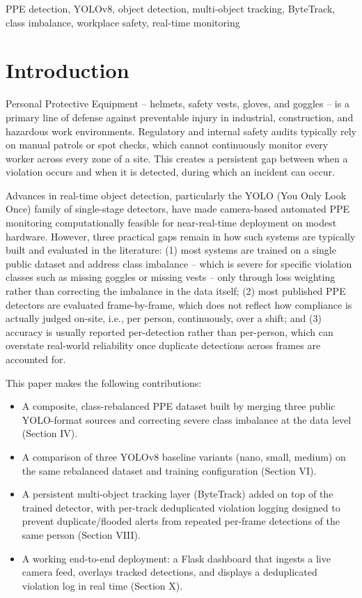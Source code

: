 \documentclass[conference]{IEEEtran}
\begin{document}
\begin{IEEEkeywords}
PPE detection, YOLOv8, object detection, multi-object tracking, ByteTrack, class imbalance, workplace safety, real-time monitoring
\end{IEEEkeywords}

\section{Introduction}

Personal Protective Equipment -- helmets, safety vests, gloves, and goggles -- is a primary line of defense against preventable injury in industrial, construction, and hazardous work environments. Regulatory and internal safety audits typically rely on manual patrols or spot checks, which cannot continuously monitor every worker across every zone of a site. This creates a persistent gap between when a violation occurs and when it is detected, during which an incident can occur.

Advances in real-time object detection, particularly the YOLO (You Only Look Once) family of single-stage detectors, have made camera-based automated PPE monitoring computationally feasible for near-real-time deployment on modest hardware. However, three practical gaps remain in how such systems are typically built and evaluated in the literature: (1) most systems are trained on a single public dataset and address class imbalance -- which is severe for specific violation classes such as missing goggles or missing vests -- only through loss weighting rather than correcting the imbalance in the data itself; (2) most published PPE detectors are evaluated frame-by-frame, which does not reflect how compliance is actually judged on-site, i.e., per person, continuously, over a shift; and (3) accuracy is usually reported per-detection rather than per-person, which can overstate real-world reliability once duplicate detections across frames are accounted for.

This paper makes the following contributions:
\begin{itemize}
    \item A composite, class-rebalanced PPE dataset built by merging three public YOLO-format sources and correcting severe class imbalance at the data level (Section IV).
    \item A comparison of three YOLOv8 baseline variants (nano, small, medium) on the same rebalanced dataset and training configuration (Section VI).
    \item A persistent multi-object tracking layer (ByteTrack) added on top of the trained detector, with per-track deduplicated violation logging designed to prevent duplicate/flooded alerts from repeated per-frame detections of the same person (Section VIII).
    \item A working end-to-end deployment: a Flask dashboard that ingests a live camera feed, overlays tracked detections, and displays a deduplicated violation log in real time (Section X).
\end{itemize}
\end{document}
